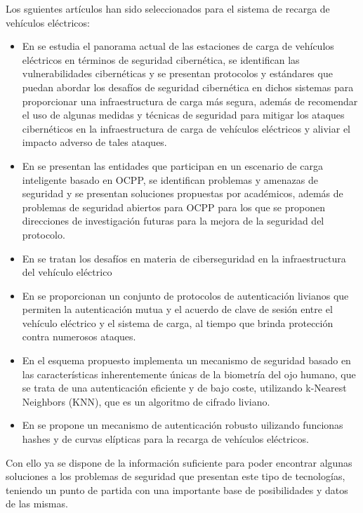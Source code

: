 \documentclass[12pt,a4paper,onecolumn,oneside]{report}
\begin{document}
Los sguientes artículos han sido seleccionados para el sistema de recarga de vehículos eléctricos:
\begin{itemize}
\item En \cite{eanueve} se estudia el panorama actual de las estaciones de carga de vehículos eléctricos en términos de seguridad cibernética, se identifican las vulnerabilidades cibernéticas y se presentan protocolos y estándares que puedan abordar los desafíos de seguridad cibernética en dichos sistemas para proporcionar una infraestructura de carga más segura, además de recomendar el uso de algunas medidas y técnicas de seguridad para mitigar los ataques cibernéticos en la infraestructura de carga de vehículos eléctricos y aliviar el impacto adverso de tales ataques.
\item En \cite{eadiez} se presentan las entidades que participan en un escenario de carga inteligente basado en OCPP, se identifican problemas y amenazas de seguridad y se presentan soluciones propuestas por académicos, además de problemas de seguridad abiertos para OCPP para los que se proponen direcciones de investigación futuras para la mejora de la seguridad del protocolo.
\item En \cite{eaonce} se tratan los desafíos en materia de ciberseguridad en la infraestructura del vehículo eléctrico
\item En \cite{eadoce} se proporcionan un conjunto de protocolos de autenticación livianos que permiten la autenticación mutua y el acuerdo de clave de sesión entre el vehículo eléctrico y el sistema de carga, al tiempo que brinda protección contra numerosos ataques.
\item En \cite{eatrece} el esquema propuesto implementa un mecanismo de seguridad basado en las características inherentemente únicas de la biometría del ojo humano, que se trata de una autenticación eficiente y de bajo coste, utilizando k-Nearest Neighbors (KNN), que es un algoritmo de cifrado liviano.
\item En \cite{eacatorce} se propone un mecanismo de autenticación robusto uilizando funcionas hashes y de curvas elípticas para la recarga de vehículos eléctricos.

\end{itemize}

Con ello ya se dispone de la información suficiente para poder encontrar algunas soluciones a los problemas de seguridad que presentan este tipo de tecnologías, teniendo un punto de partida con una importante base de posibilidades y datos de las mismas.
\end{document}
